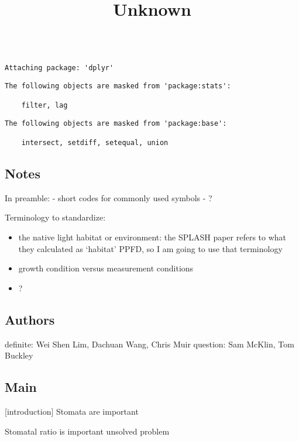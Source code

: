 \documentclass[
  letterpaper,
  DIV=11,
  numbers=noendperiod]{scrartcl}
\title{Unknown}
\author{}
\date{}
\begin{document}
\maketitle

\begin{verbatim}

Attaching package: 'dplyr'
\end{verbatim}

\begin{verbatim}
The following objects are masked from 'package:stats':

    filter, lag
\end{verbatim}

\begin{verbatim}
The following objects are masked from 'package:base':

    intersect, setdiff, setequal, union
\end{verbatim}

\subsection{Notes}\label{notes}

In preamble: - short codes for commonly used symbols - ?

Terminology to standardize:

\begin{itemize}
\item
  the native light habitat or environment: the SPLASH paper refers to
  what they calculated as `habitat' PPFD, so I am going to use that
  terminology
\item
  growth condition versus measurement conditions
\item
  ?
\end{itemize}

\subsection{Authors}\label{authors}

definite: Wei Shen Lim, Dachuan Wang, Chris Muir question: Sam McKlin,
Tom Buckley

\subsection{Main}\label{main}

{[}introduction{]} Stomata are important

Stomatal ratio is important unsolved problem
\end{document}
